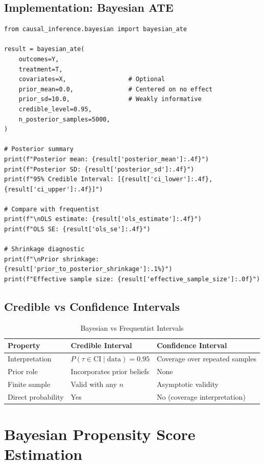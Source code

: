 \subsection{Implementation: Bayesian ATE}

\begin{verbatim}
from causal_inference.bayesian import bayesian_ate

result = bayesian_ate(
    outcomes=Y,
    treatment=T,
    covariates=X,                 # Optional
    prior_mean=0.0,               # Centered on no effect
    prior_sd=10.0,                # Weakly informative
    credible_level=0.95,
    n_posterior_samples=5000,
)

# Posterior summary
print(f"Posterior mean: {result['posterior_mean']:.4f}")
print(f"Posterior SD: {result['posterior_sd']:.4f}")
print(f"95% Credible Interval: [{result['ci_lower']:.4f}, {result['ci_upper']:.4f}]")

# Compare with frequentist
print(f"\nOLS estimate: {result['ols_estimate']:.4f}")
print(f"OLS SE: {result['ols_se']:.4f}")

# Shrinkage diagnostic
print(f"\nPrior shrinkage: {result['prior_to_posterior_shrinkage']:.1%}")
print(f"Effective sample size: {result['effective_sample_size']:.0f}")
\end{verbatim}

\subsection{Credible vs Confidence Intervals}

\begin{table}[h]
\centering
\caption{Bayesian vs Frequentist Intervals}
\begin{tabular}{lll}
\toprule
Property & Credible Interval & Confidence Interval \\
\midrule
Interpretation & $P(\tau \in \text{CI} \mid \text{data}) = 0.95$ & Coverage over repeated samples \\
Prior role & Incorporates prior beliefs & None \\
Finite sample & Valid with any $n$ & Asymptotic validity \\
Direct probability & Yes & No (coverage interpretation) \\
\bottomrule
\end{tabular}
\end{table}


\section{Bayesian Propensity Score Estimation}

